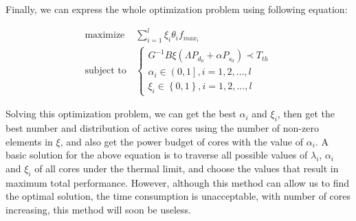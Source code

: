 Finally, we can express the whole optimization problem using following equation:

\begin{equation}
\begin{split}
\text{maximize} \,\, &\sum_{i=1}^l \xi_i \theta_i f_{max_i}\\
\text{subject to}
&\begin{cases}
G^{-1} B \xi \left( \Lambda P_{d_0}+ \alpha P_{s_0} \right) \prec T_{th} \\
\alpha_i \in \left(0,1\right], i=1,2,\ldots,l  \\
\xi_i \in \left\{0,1\right\}, i=1,2,\ldots,l
\end{cases}
\end{split}
\end{equation}



Solving this optimization problem, we can get the best $\alpha_i$ and $\xi_i$, then get the best number and distribution of active cores using the number of
non-zero elements in $\xi$, and also get the power budget of cores with the value of $\alpha_i$.
A basic solution for the above equation is to traverse all possible values of $\lambda_i$, $\alpha_i$ and $\xi_i$ of all cores under the thermal limit,
and choose the values that result in maximum total performance. However, although this method can allow us to find the optimal solution, the time consumption
is unacceptable, with number of cores increasing, this method will soon be useless.
